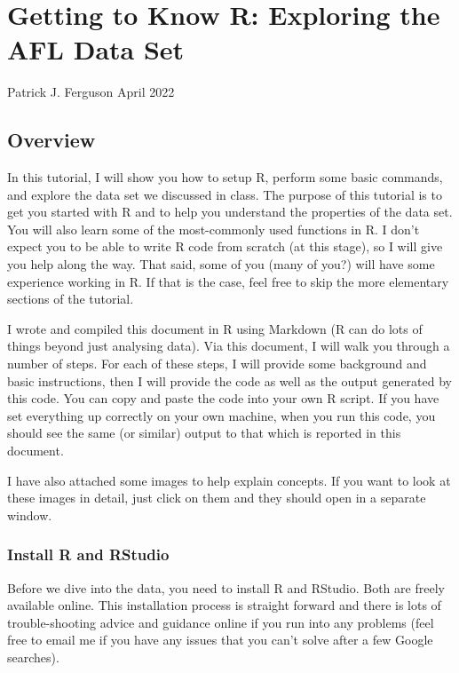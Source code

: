 \documentclass[
]{article}
\author{}
\date{\vspace{-2.5em}}
\begin{document}
\hypertarget{getting-to-know-r-exploring-the-afl-data-set}{%
\section{Getting to Know R: Exploring the AFL Data
Set}\label{getting-to-know-r-exploring-the-afl-data-set}}

Patrick J. Ferguson April 2022

\hypertarget{overview}{%
\subsection{Overview}\label{overview}}

In this tutorial, I will show you how to setup R, perform some basic
commands, and explore the data set we discussed in class. The purpose of
this tutorial is to get you started with R and to help you understand
the properties of the data set. You will also learn some of the
most-commonly used functions in R. I don't expect you to be able to
write R code from scratch (at this stage), so I will give you help along
the way. That said, some of you (many of you?) will have some experience
working in R. If that is the case, feel free to skip the more elementary
sections of the tutorial.

I wrote and compiled this document in R using Markdown (R can do lots of
things beyond just analysing data). Via this document, I will walk you
through a number of steps. For each of these steps, I will provide some
background and basic instructions, then I will provide the code as well
as the output generated by this code. You can copy and paste the code
into your own R script. If you have set everything up correctly on your
own machine, when you run this code, you should see the same (or
similar) output to that which is reported in this document.

I have also attached some images to help explain concepts. If you want
to look at these images in detail, just click on them and they should
open in a separate window.

\hypertarget{install-r-and-rstudio}{%
\subsubsection{Install R and RStudio}\label{install-r-and-rstudio}}

Before we dive into the data, you need to install R and RStudio. Both
are freely available online. This installation process is straight
forward and there is lots of trouble-shooting advice and guidance online
if you run into any problems (feel free to email me if you have any
issues that you can't solve after a few Google searches).
\end{document}
